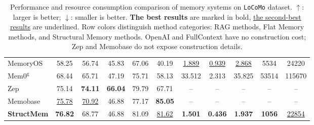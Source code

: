 \begin{table}[t]
{\begin{tabular}{l|c|cccc|ccc|c|c}
\midrule
\rowcolor{StructuralMemoryColor} MemoryOS & 58.25 & 56.74	& 45.83	& 67.06	& 40.19 & \underline{1.889} & \underline{0.939} & \underline{2.868} & 5534 & 24220\\
\rowcolor{StructuralMemoryColor} 
$\text{Mem0}^\text{g}$ & 68.44 &65.71 &47.19 &75.71	&58.13 & 33.512 & 2.313 & 35.825 & 53514 & 115670 \\
\rowcolor{StructuralMemoryColor} Zep & 75.14 & \textbf{74.11} & \textbf{66.04} & 79.79 & 67.71 & -- & -- & -- & -- & -- \\
\rowcolor{StructuralMemoryColor} Memobase & \underline{75.78} & \underline{70.92} & 46.88 & 77.17 & \textbf{85.05} & -- & -- & -- & -- & -- \\
\rowcolor{StructuralMemoryColor} \textbf{StructMem} & \textbf{76.82} & 68.77 & 46.88 & 81.09 & \underline{81.62} & \textbf{1.501} & \textbf{0.436} & \textbf{1.937} & \textbf{1056} & \underline{22854} \\
\bottomrule[1pt]
\end{tabular}
} 
\caption{Performance and resource consumption comparison of memory systems on \texttt{LoCoMo} dataset. $\uparrow$: larger is better; $\downarrow$:  smaller is better.  \textbf{The best results} are marked in bold,  \underline{the second-best results} are underlined. Row colors distinguish method categories: \colorbox{RAGColor}{RAG methods}, \colorbox{MemoryColor}{Flat Memory methods}, and \colorbox{StructuralMemoryColor}{Structural Memory methods}. OpenAI and FullContext have no construction cost; Zep and Memobase do not expose construction details.}
\label{tab:locomo}
\end{table}
